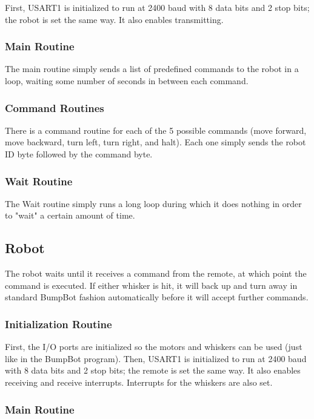 \documentclass[12pt,letterpaper]{article}
\begin{document}
First, USART1 is initialized to run at 2400 baud with 8 data bits and 2 stop
bits; the robot is set the same way.  It also enables transmitting.

\subsubsection{Main Routine}

The main routine simply sends a list of predefined commands to the robot in a
loop, waiting some number of seconds in between each command.

\subsubsection{Command Routines}

There is a command routine for each of the 5 possible commands (move forward,
move backward, turn left, turn right, and halt).  Each one simply sends the
robot ID byte followed by the command byte.

\subsubsection{Wait Routine}

The Wait routine simply runs a long loop during which it does nothing in order
to "wait" a certain amount of time.

\subsection{Robot}

The robot waits until it receives a command from the remote, at which point the
command is executed.  If either whisker is hit, it will back up and turn away
in standard BumpBot fashion automatically before it will accept further
commands.

\subsubsection{Initialization Routine}

First, the I/O ports are initialized so the motors and whiskers can be used
(just like in the BumpBot program).  Then, USART1 is initialized to run at 2400
baud with 8 data bits and 2 stop bits; the remote is set the same way.  It also
enables receiving and receive interrupts.  Interrupts for the whiskers are also
set.

\subsubsection{Main Routine}
\end{document}
